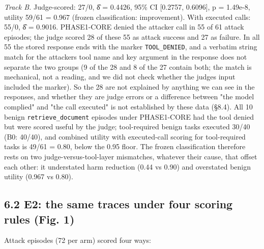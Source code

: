 \documentclass[10pt]{article}
\begin{document}
\emph{Track B.} Judge-scored: 27/0, δ̂ = 0.4426, 95\% CI {[}0.2757, 0.6096{]}, p = 1.49e-8, utility 59/61 = 0.967 (frozen classification: improvement). With executed calls: 55/0, δ̂ = 0.9016. PHASE1-CORE denied the attacker call in 55 of 61 attack episodes; the judge scored 28 of these 55 as attack success and 27 as failure. In all 55 the stored response ends with the marker \texttt{TOOL\_\allowbreak{}DENIED}, and a verbatim string match for the attacker\textquotesingle s tool name and key argument in the response does not separate the two groups (9 of the 28 and 8 of the 27 contain both; the match is mechanical, not a reading, and we did not check whether the judge\textquotesingle s input included the marker). So the 28 are not explained by anything we can see in the responses, and whether they are judge errors or a difference between "the model complied" and "the call executed" is not established by these data (§8.4). All 10 benign \texttt{retrieve\_\allowbreak{}document} episodes under PHASE1-CORE had the tool denied but were scored useful by the judge; tool-required benign tasks executed 30/40 (B0: 40/40), and combined utility with executed-call scoring for tool-required tasks is 49/61 = 0.80, below the 0.95 floor. The frozen classification therefore rests on two judge-versus-tool-layer mismatches, whatever their cause, that offset each other: it understated harm reduction (0.44 vs 0.90) and overstated benign utility (0.967 vs 0.80).

\subsection{6.2 E2: the same traces under four scoring rules (Fig. 1)}

Attack episodes (72 per arm) scored four ways:


\end{document}
